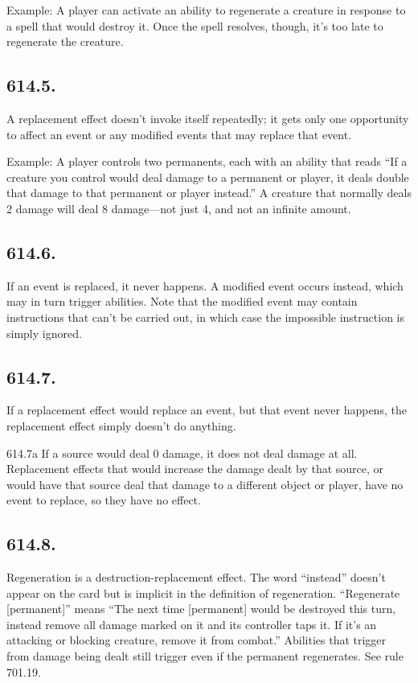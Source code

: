 Example: A player can activate an ability to regenerate a creature in response to a spell that would destroy it. Once the spell resolves, though, it’s too late to regenerate the creature.

\subsection*{614.5.}
A replacement effect doesn’t invoke itself repeatedly; it gets only one opportunity to affect an event or any modified events that may replace that event.

Example: A player controls two permanents, each with an ability that reads “If a creature you control would deal damage to a permanent or player, it deals double that damage to that permanent or player instead.” A creature that normally deals 2 damage will deal 8 damage—not just 4, and not an infinite amount.

\subsection*{614.6.}
If an event is replaced, it never happens. A modified event occurs instead, which may in turn trigger abilities. Note that the modified event may contain instructions that can’t be carried out, in which case the impossible instruction is simply ignored.

\subsection*{614.7.}
If a replacement effect would replace an event, but that event never happens, the replacement effect simply doesn’t do anything.

614.7a If a source would deal 0 damage, it does not deal damage at all. Replacement effects that would increase the damage dealt by that source, or would have that source deal that damage to a different object or player, have no event to replace, so they have no effect.

\subsection*{614.8.}
Regeneration is a destruction-replacement effect. The word “instead” doesn’t appear on the card but is implicit in the definition of regeneration. “Regenerate [permanent]” means “The next time [permanent] would be destroyed this turn, instead remove all damage marked on it and its controller taps it. If it’s an attacking or blocking creature, remove it from combat.” Abilities that trigger from damage being dealt still trigger even if the permanent regenerates. See rule 701.19.

